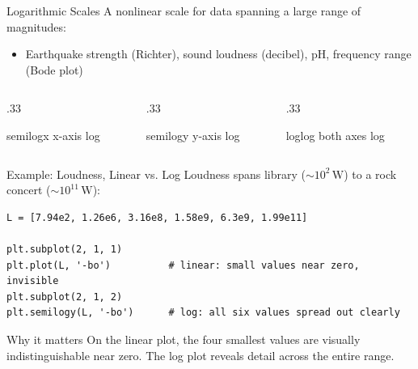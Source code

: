 \documentclass[9pt,aspectratio=169,xcolor=table]{beamer}
\begin{document}
\begin{frame}{Logarithmic Scales}
    \leavevmode
    A nonlinear scale for data spanning a \alert{large range} of
    magnitudes:

    \vspace{2mm}
    \begin{itemize}
        \item Earthquake strength (Richter), sound loudness (decibel),
              pH, frequency range (Bode plot)
    \end{itemize}

    \vspace{3mm}
    \begin{columns}[t]
        \begin{column}{.33\textwidth}
            \begin{block}{\scriptsize semilogx}
                \scriptsize x-axis log
            \end{block}
        \end{column}
        \begin{column}{.33\textwidth}
            \begin{block}{\scriptsize semilogy}
                \scriptsize y-axis log
            \end{block}
        \end{column}
        \begin{column}{.33\textwidth}
            \begin{block}{\scriptsize loglog}
                \scriptsize both axes log
            \end{block}
        \end{column}
    \end{columns}
\end{frame}

\begin{frame}[fragile]{Example: Loudness, Linear vs. Log}
    \leavevmode
    Loudness spans library ($\sim\!10^2\,\text{W}$) to a rock concert
    ($\sim\!10^{11}\,\text{W}$):

\begin{lstlisting}
L = [7.94e2, 1.26e6, 3.16e8, 1.58e9, 6.3e9, 1.99e11]

plt.subplot(2, 1, 1)
plt.plot(L, '-bo')          # linear: small values near zero, invisible
plt.subplot(2, 1, 2)
plt.semilogy(L, '-bo')      # log: all six values spread out clearly
\end{lstlisting}

    \vspace{1mm}
    \begin{alertblock}{Why it matters}
        On the linear plot, the four smallest values are visually
        indistinguishable near zero. The log plot reveals detail across
        the \alert{entire} range.
    \end{alertblock}
\end{frame}
\end{document}
